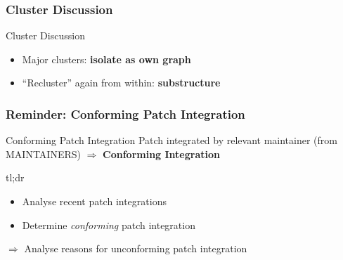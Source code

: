 \documentclass[9pt]{beamer}
\begin{document}
	\begin{frame}
	\frametitle{Cluster Discussion}
		\begin{block}{Cluster Discussion}
			\begin{itemize}
				\item Major clusters: \textbf{isolate as own graph}
				\item ``Recluster'' again from within: \textbf{substructure}
			\end{itemize}
		\end{block}
		
	\end{frame}

	\begin{frame}
	\frametitle{Reminder: Conforming Patch Integration} %
		\begin{alertblock}{Conforming Patch Integration}
			Patch integrated by relevant maintainer (from MAINTAINERS) $\Rightarrow$ \textbf{Conforming Integration}
		\end{alertblock}

		\begin{block}{tl;dr}
			\begin{itemize}
				\item Analyse recent patch integrations
				\item Determine \textit{conforming} patch integration
			\end{itemize}
		\end{block}
		$\Rightarrow$ Analyse reasons for unconforming patch integration
	\end{frame}
\end{document}
